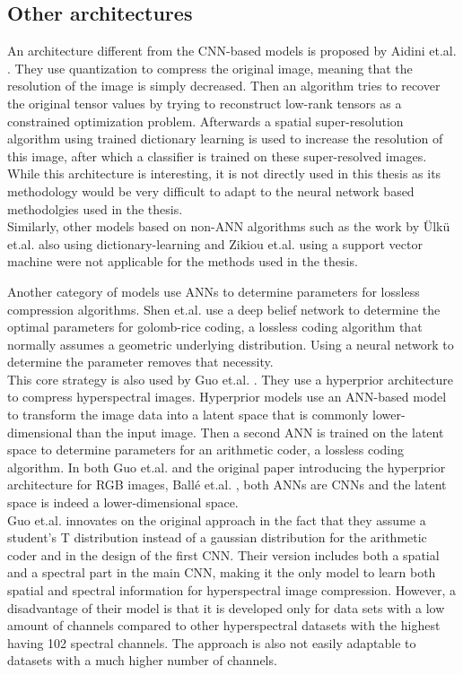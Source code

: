 \subsection{Other architectures \label{sec:ch2others}}
An architecture different from the CNN-based models is proposed by Aidini et.al. \citep{aidini_hyperspectral_2019}. They use quantization to compress the original image, meaning that the resolution of the image is simply decreased. Then an algorithm tries to recover the original tensor values by trying to reconstruct low-rank tensors as a constrained optimization problem. Afterwards a spatial super-resolution algorithm using trained dictionary learning is used to increase the resolution of this image, after which a classifier is trained on these super-resolved images. While this architecture is interesting, it is not directly used in this thesis as its methodology would be very difficult to adapt to the neural network based methodolgies used in the thesis.\\
Similarly, other models based on non-ANN algorithms such as the work by Ülkü et.al. \citep{ulku_large-scale_2018} also using dictionary-learning and Zikiou et.al. \citep{zikiou_support_2020} using a support vector machine were not applicable for the methods used in the thesis.

Another category of models use ANNs to determine parameters for lossless compression algorithms. Shen et.al. \citep{shen_golomb-rice_2017} use a deep belief network to determine the optimal parameters for golomb-rice coding, a lossless coding algorithm that normally assumes a geometric underlying distribution. Using a neural network to determine the parameter removes that necessity.\\
This core strategy is also used by Guo et.al. \citep{guo_learned_2021}. They use a hyperprior architecture to compress hyperspectral images. Hyperprior models use an ANN-based model to transform the image data into a latent space that is commonly lower-dimensional than the input image. Then a second ANN is trained on the latent space to determine parameters for an arithmetic coder, a lossless coding algorithm. In both Guo et.al. and the original paper introducing the hyperprior architecture for RGB images, Ballé et.al. \citep{balle_end--end_2017}, both ANNs are CNNs and the latent space is indeed a lower-dimensional space.\\
Guo et.al. innovates on the original approach in the fact that they assume a student's T distribution instead of a gaussian distribution for the arithmetic coder and in the design of the first CNN. Their version includes both a spatial and a spectral part in the main CNN, making it the only model to learn both spatial and spectral information for hyperspectral image compression. However, a disadvantage of their model is that it is developed only for data sets with a low amount of channels compared to other hyperspectral datasets with the highest having 102 spectral channels. The approach is also not easily adaptable to datasets with a much higher number of channels.

